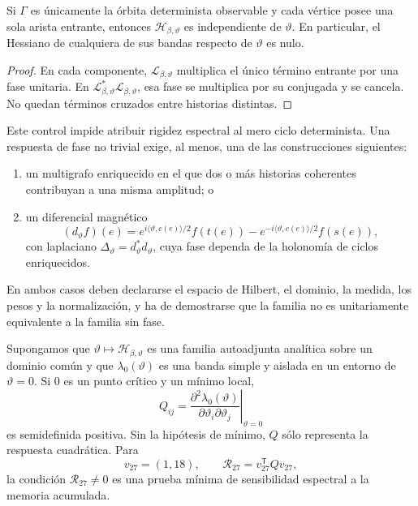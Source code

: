 \begin{proposition}
\label{prop:control-negativo-espectral-determinista}
Si \(\Gamma\) es únicamente la órbita determinista observable y cada vértice
posee una sola arista entrante, entonces
\(\mathcal H_{\beta,\vartheta}\) es independiente de \(\vartheta\). En
particular, el Hessiano de cualquiera de sus bandas respecto de
\(\vartheta\) es nulo.
\end{proposition}

\begin{proof}
En cada componente, \(\mathcal L_{\beta,\vartheta}\) multiplica el único
término entrante por una fase unitaria. En
\(\mathcal L_{\beta,\vartheta}^{*}\mathcal L_{\beta,\vartheta}\), esa fase
se multiplica por su conjugada y se cancela. No quedan términos cruzados
entre historias distintas.
\end{proof}

Este control impide atribuir rigidez espectral al mero ciclo determinista.
Una respuesta de fase no trivial exige, al menos, una de las construcciones
siguientes:
\begin{enumerate}
 \item un multigrafo enriquecido en el que dos o más historias coherentes
 contribuyan a una misma amplitud; o
 \item un diferencial magnético
 \[
  (d_\vartheta f)(e)
  =
  e^{i\langle\vartheta,c(e)\rangle/2}f(t(e))
  -
  e^{-i\langle\vartheta,c(e)\rangle/2}f(s(e)),
 \]
 con laplaciano
 \(\Delta_\vartheta=d_\vartheta^*d_\vartheta\), cuya fase dependa de la
 holonomía de ciclos enriquecidos.
\end{enumerate}
En ambos casos deben declararse el espacio de Hilbert, el dominio, la medida,
los pesos y la normalización, y ha de demostrarse que la familia no es
unitariamente equivalente a la familia sin fase.

Supongamos que
\(\vartheta\mapsto\mathcal H_{\beta,\vartheta}\) es una familia
autoadjunta analítica sobre un dominio común y que
\(\lambda_0(\vartheta)\) es una banda simple y aislada en un entorno de
\(\vartheta=0\). Si \(0\) es un punto crítico y un mínimo local,
\[
 Q_{ij}
 =
 \left.
 \frac{\partial^2\lambda_0(\vartheta)}
      {\partial\vartheta_i\partial\vartheta_j}
 \right|_{\vartheta=0}
\]
es semidefinida positiva. Sin la hipótesis de mínimo, \(Q\) sólo representa
la respuesta cuadrática. Para
\[
 v_{27}=(1,18),
 \qquad
 \mathcal R_{27}=v_{27}^{\mathsf T}Qv_{27},
\]
la condición \(\mathcal R_{27}\neq0\) es una prueba mínima de sensibilidad
espectral a la memoria acumulada.

